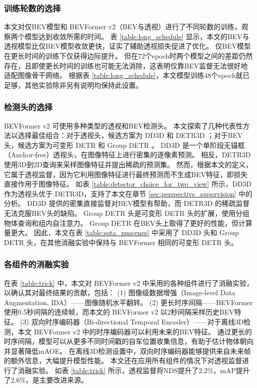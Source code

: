


\subsubsection{训练轮数的选择}
本文对仅BEV模型和 BEVFormer v2（BEV与透视）进行了不同轮数的训练，观察两个模型达到收敛所需的时间。
表 \ref{table:long_schedule} 显示，本文的BEV与透视模型比仅BEV模型收敛更快，证实了辅助透视损失促进了优化。
仅BEV模型在更长时间的训练下仅获得边际提升。
但在72个epoch时两个模型之间的差距仍然存在，且即使更长时间的训练也可能无法消除，这表明仅靠BEV监督无法很好地适配图像骨干网络。
根据表 \ref{table:long_schedule}，本文模型训练48个epoch就已足够，其他实验除非另有说明均保持此设置。

\subsubsection{检测头的选择}
BEVFormer v2 可使用多种类型的透视和BEV检测头。
本文探索了几种代表性方法以选择最佳组合：对于透视头，候选方案为 DD3D \cite{DD3D} 和 DETR3D \cite{DETR3D}；对于BEV头，候选方案为可变形 DETR \cite{deformable-detr} 和 Group DETR \cite{groupdetr}。
DD3D 是一个单阶段无锚框（Anchor-free）透视头，在图像特征上进行密集的逐像素预测。
相反，DETR3D 使用3D到2D查询来采样图像特征并提出稀疏的预测集。
然而，根据本文的定义，它属于透视监督，因为它利用图像特征进行最终预测而不生成BEV特征，即损失直接作用于图像特征。
如表 \ref{table:detector_choice_for_two_view} 所示，DD3D 作为透视头优于 DETR3D，支持了本文在章节 \ref{sec:perspective_supervision} 中的分析。
DD3D 提供的密集直接监督对BEV模型有帮助，而 DETR3D 的稀疏监督无法克服BEV头的缺陷。
Group DETR 头是可变形 DETR 头的扩展，使用分组物体查询和组内自注意力。
Group DETR 在BEV头上取得了更好的性能，但计算量更大。
因此，本文在表 \ref{table:sota_nuscenes} 中采用了 DD3D 头和 Group DETR 头，在其他消融实验中保持与 BEVFormer \cite{bevformer} 相同的可变形 DETR 头。

\subsubsection{各组件的消融实验}
\label{sec:bells_and_whistles}
在表 \ref{table:trick} 中，本文对 BEVFormer v2 中采用的各种组件进行了消融实验，以确认其对最终结果的贡献，包括：
(1) 图像级数据增强（Image-level Data Augmentation, IDA）——图像随机水平翻转。
(2) 更长时序间隔——BEVFormer \cite{bevformer} 使用0.5秒间隔的连续帧，而本文的 BEVFormer v2 以2秒间隔采样历史BEV特征。
(3) 双向时序编码器（Bi-directional Temporal Encoder）——对于离线3D检测，本文 BEVFormer v2 中的时序编码器可以利用未来的BEV特征。
通过更长的时序间隔，模型可以从更多不同时间戳的自车位置收集信息，有助于估计物体朝向并显著降低mAOE。
在离线3D检测设置中，双向时序编码器能够提供来自未来帧的额外信息，大幅提升模型性能。
本文还在应用所有组件的情况下对透视监督进行了消融实验。
如表 \ref{table:trick} 所示，透视监督将NDS提升了2.2\%，mAP提升了2.6\%，是主要改进来源。
